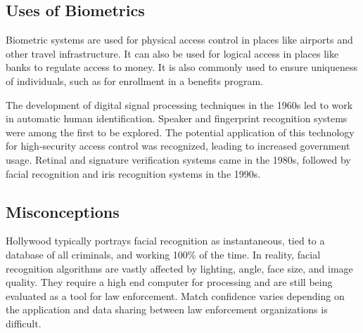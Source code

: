 \documentclass{math}
\begin{document}
\subsection*{Uses of Biometrics}
Biometric systems are used for physical access control in places like airports
and other travel infrastructure. It can also be used for logical access in
places like banks to regulate access to money. It is also commonly used to
ensure uniqueness of individuals, such as for enrollment in a benefits program.
\par
The development of digital signal processing techniques in the 1960s led to
work in automatic human identification. Speaker and fingerprint recognition
systems were among the first to be explored. The potential application of
this technology for high-security access control was recognized, leading to
increased government usage. Retinal and signature verification systems came
in the 1980s, followed by facial recognition and iris recognition systems in
the 1990s.

\subsection*{Misconceptions}
Hollywood typically portrays facial recognition as instantaneous, tied to a
database of all criminals, and working 100\% of the time. In reality, facial
recognition algorithms are vastly affected by lighting, angle, face size, and
image quality. They require a high end computer for processing and are still
being evaluated as a tool for law enforcement. Match confidence varies depending
on the application and data sharing between law enforcement organizations is
difficult.
\end{document}
